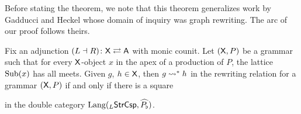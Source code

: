 \documentclass{amsart}
\begin{document}
Before stating the theorem, we note that this theorem
generalizes work by Gadducci and Heckel
\cite{Gadd_IndGraphTrans} whose domain of
inquiry was graph rewriting. The arc of our
proof follows theirs.


\begin{theorem} \label{thm:inductive-rewriting}
  Fix an adjunction $ (L \dashv R) \colon \mathsf{X} \rightleftarrows \mathsf{A} $ with
  monic counit. Let $ ( \mathsf{X} , P ) $ be a grammar such that
  for every $ \mathsf{X} $-object $ x $ in the apex of a production
  of $ P $, the lattice $ \operatorname{Sub} (x) $ has all meets. Given
  $ g $, $ h \in \mathsf{X} $, then $ g \rightsquigarrow^\ast h $ in the
  rewriting relation for a grammar $ ( \mathsf{X} , P ) $ if and
  only if there is a square
   
  in the double category $ \mathrm{Lang} ( _{L}\mathsf{StrCsp} , \widehat{P_\flat} ) $.
\end{theorem}
\end{document}
